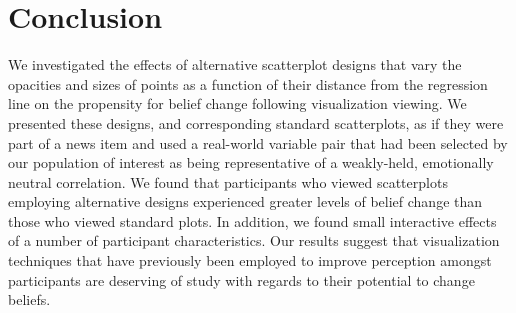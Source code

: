 \documentclass[manuscript,screen,review,anonymous]{acmart}
\begin{document}
\section{Conclusion}\label{sec-conclusion}

We investigated the effects of alternative scatterplot designs that vary
the opacities and sizes of points as a function of their distance from
the regression line on the propensity for belief change following
visualization viewing. We presented these designs, and corresponding
standard scatterplots, as if they were part of a news item and used a
real-world variable pair that had been selected by our population of
interest as being representative of a weakly-held, emotionally neutral
correlation. We found that participants who viewed scatterplots
employing alternative designs experienced greater levels of belief
change than those who viewed standard plots. In addition, we found small
interactive effects of a number of participant characteristics. Our
results suggest that visualization techniques that have previously been
employed to improve perception amongst participants are deserving of
study with regards to their potential to change beliefs.




\end{document}
